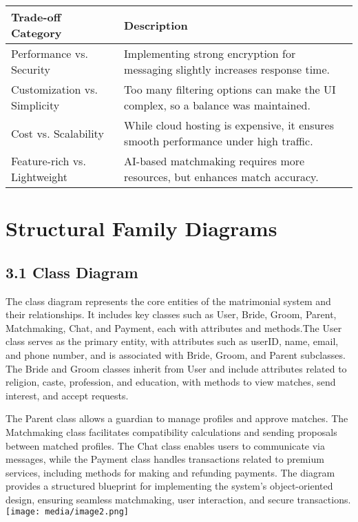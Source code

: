 \begin{longtable}[]{@{}
  >{\raggedright\arraybackslash}p{}
  >{\raggedright\arraybackslash}p{}@{}}
\toprule\noalign{}
\begin{minipage}[b]{\linewidth}\raggedright
\textbf{Trade-off Category}
\end{minipage} & \begin{minipage}[b]{\linewidth}\raggedright
\textbf{Description}
\end{minipage} \\
\midrule\noalign{}
\endhead
\bottomrule\noalign{}
\endlastfoot
Performance vs. Security & Implementing strong encryption for messaging
slightly increases response time. \\
Customization vs. Simplicity & Too many filtering options can make the
UI complex, so a balance was maintained. \\
Cost vs. Scalability & While cloud hosting is expensive, it ensures
smooth performance under high traffic. \\
Feature-rich vs. Lightweight & AI-based matchmaking requires more
resources, but enhances match accuracy. \\
\end{longtable}

\section{\texorpdfstring{Structural Family Diagrams
}{Structural Family Diagrams }}\label{structural-family-diagrams}

\subsection{3.1 Class Diagram}\label{class-diagram}

The class diagram represents the core entities of the matrimonial system
and their relationships. It includes key classes such as User, Bride,
Groom, Parent, Matchmaking, Chat, and Payment, each with attributes and
methods.The User class serves as the primary entity, with attributes
such as userID, name, email, and phone number, and is associated with
Bride, Groom, and Parent subclasses. The Bride and Groom classes inherit
from User and include attributes related to religion, caste, profession,
and education, with methods to view matches, send interest, and accept
requests.

The Parent class allows a guardian to manage profiles and approve
matches. The Matchmaking class facilitates compatibility calculations
and sending proposals between matched profiles. The Chat class enables
users to communicate via messages, while the Payment class handles
transactions related to premium services, including methods for making
and refunding payments. The diagram provides a structured blueprint for
implementing the system's object-oriented design, ensuring seamless
matchmaking, user interaction, and secure
transactions.\texttt{[image: media/image2.png]}

